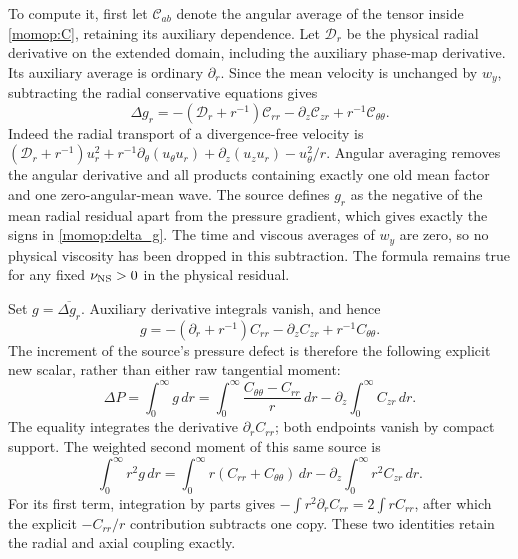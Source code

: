 To compute it, first let $\mathcal C_{ab}$ denote the angular average
of the tensor inside \eqref{momop:C}, retaining its auxiliary dependence.
Let $\mathcal D_r$ be the physical radial derivative on the extended
domain, including the auxiliary phase-map derivative. Its auxiliary
average is ordinary $\partial_r$. Since the mean velocity is unchanged
by $w_y$, subtracting the radial conservative equations gives
\begin{equation}\label{momop:delta_g}
 \Delta g_r=-(\mathcal D_r+r^{-1})\mathcal C_{rr}
                   -\partial_z\mathcal C_{zr}
                   +r^{-1}\mathcal C_{\theta\theta}.
\end{equation}
Indeed the radial transport of a divergence-free velocity is
$(\mathcal D_r+r^{-1})u_r^2+
r^{-1}\partial_\theta(u_\theta u_r)+
\partial_z(u_zu_r)-u_\theta^2/r$.
Angular averaging removes the angular derivative and all products
containing exactly one old mean factor and one zero-angular-mean wave.
The source defines $g_r$ as the negative of the mean radial residual
apart from the pressure gradient, which gives exactly the signs in
\eqref{momop:delta_g}. The time and viscous averages of $w_y$
are zero, so no physical viscosity has been dropped in this subtraction.
The formula remains true for any fixed $\nu_{\rm NS}>0$ in the
physical residual.

Set $g=\overline{\Delta g_r}$. Auxiliary derivative integrals vanish,
and hence
\begin{equation}\label{momop:gbar}
 g=-(\partial_r+r^{-1})C_{rr}-\partial_zC_{zr}
                                    +r^{-1}C_{\theta\theta}.
\end{equation}
The increment of the source's pressure defect is therefore the
following explicit new scalar, rather than either raw tangential moment:
\begin{equation}\label{momop:deltaP}
 \Delta P=\int_0^\infty g\,dr
 =\int_0^\infty\frac{C_{\theta\theta}-C_{rr}}r\,dr
                           -\partial_z\int_0^\infty C_{zr}\,dr .
\end{equation}
The equality integrates the derivative $\partial_rC_{rr}$;
both endpoints vanish by compact support. The weighted second
moment of this same source is
\begin{equation}\label{momop:gsecond}
 \int_0^\infty r^2g\,dr
 =\int_0^\infty r(C_{rr}+C_{\theta\theta})\,dr
                   -\partial_z\int_0^\infty r^2C_{zr}\,dr .
\end{equation}
For its first term, integration by parts gives
$-\int r^2\partial_rC_{rr}=2\int rC_{rr}$, after which the
explicit $-C_{rr}/r$ contribution subtracts one copy.
These two identities retain the radial and axial coupling exactly.

